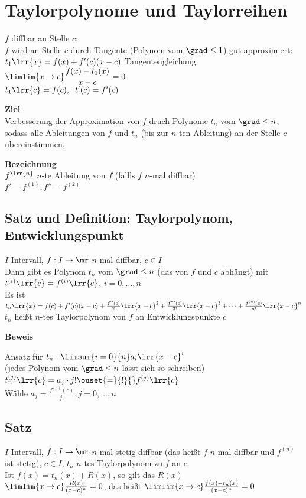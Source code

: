 \chapter{Taylorpolynome und Taylorreihen}

	$f$ diffbar an Stelle $c$:\\
	$f$ wird an Stelle $c$ durch Tangente (Polynom vom $\grad\leq 1$) gut approximiert:\\
	$t_1\lrr{x}=f(x)+f'(c)(x-c)$ Tangentengleichung\\
	$\limlim{x\rightarrow c}\dfrac{f(x)-t_1(x)}{x-c}=0$\\
	$t_1\lrr{c}=f(c),\;\; t'(c)=f'(c)$
	
	\textbf{Ziel}\\
	Verbesserung der Approximation von $f$ druch Polynome $t_n$ vom $\grad\leq n$, sodass alle Ableitungen von $f$ und $t_n$ (bis zur $n$-ten Ableitung) an der Stelle $c$ übereinstimmen.
	
	\textbf{Bezeichnung}\\
	$f^{\lrr{n}}$ $n$-te Ableitung von $f$ (fallls $f$ $n$-mal diffbar)\\
	$f'=f^{(1)}, f''=f^(2)$
	
\section{Satz und Definition: Taylorpolynom, Entwicklungspunkt}
	$I$ Intervall, $f:I\rightarrow\mr$ $n$-mal diffbar, $c\in I$\\
	Dann gibt es Polynom $t_n$ vom $\grad\leq n$ (das von $f$ und $c$ abhängt) mit $t^{(i)}\lrr{c}=f^{(i)}\lrr{c}$, $i=0,\dots, n$\\
	Es ist $t_n\lrr{x}=f(c)+f'(c)(x-c)+\frac{f''(c)}{2}\lrr{x-c}^2+\frac{f'''(c)}{3!}\lrr{x-c}^3+\dots+\frac{f^{(n)}(c)}{n!}\lrr{x-c}^n$\\
	$t_n$ heißt $n$-tes Taylorpolynom von $f$ an Entwicklungspunkte $c$
	
	\textbf{Beweis}
	
	Ansatz für $t_n:\limsum{i=0}{n}a_i\lrr{x-c}^i$\\
	(jedes Polynom vom $\grad\leq n$ lässt sich so schreiben)\\
	$t_n^{(j)}\lrr{c}=a_j\cdot j!\ouset{=}{!}{} f^{(j)}\lrr{c}$\\
	Wähle $a_j=\frac{f^{(j)}(c)}{j!}, j=0,\dots, n$
	
\section{Satz}
	$I$ Intervall, $f:I\rightarrow\mr$ $n$-mal stetig diffbar (das heißt $f$ $n$-mal diffbar und $f^{(n)}$ ist stetig), $c\in I$, $t_n$ $n$-tes Taylorpolynom zu $f$ an $c$.\\
	Ist $f(x)=t_n(x)+R(x)$, so gilt das  $R(x)$\\
	$\limlim{x\rightarrow c}\frac{R(x)}{(x-c)^n}=0$, das heißt $\limlim{x\rightarrow c}\frac{f(x)-t_n(x)}{(x-c)^n}=0$
	
